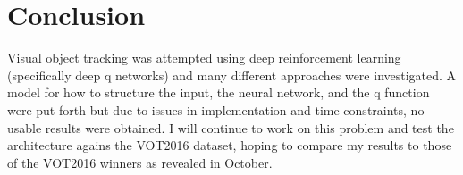 \documentclass[letterpaper,12pt,titlepage,oneside,final]{book}
\let\origdoublepage\cleardoublepage
\newcommand{\clearemptydoublepage}{%
  \clearpage{\pagestyle{empty}\origdoublepage}}
\let\cleardoublepage\clearemptydoublepage
\begin{document}
\section{Conclusion}
Visual object tracking was attempted using deep reinforcement learning (specifically deep q networks) and many different approaches were investigated. A model for how to structure the input, the neural network, and the q function were put forth but due to issues in implementation and time constraints, no usable results were obtained. I will continue to work on this problem and test the architecture agains the VOT2016 dataset, hoping to compare my results to those of the VOT2016 winners as revealed in October.



\cleardoublepage %
\renewcommand*{\bibname}{References}




\nocite{*}
\end{document}
